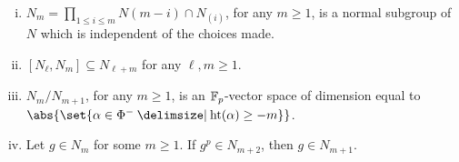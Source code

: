 \begin{lemma}\label{lem:N_m}
  \begin{enumerate}[(i)]
  \item $N_m = \prod_{1 \leq i \leq m} N(m-i) \cap N_{(i)}$, for any $m \geq 1$, is a normal subgroup of $N$ which is independent of the choices made.\label{item:N_m}

  \item $[N_\ell,N_m] \subseteq N_{\ell + m}$ for any $\ell,m \geq 1$.\label{item:N_mcom}

  \item $N_m/N_{m+1}$, for any $m \geq 1$, is an $\mathbb{F}_p$-vector space of dimension equal to $\abs{\set{\alpha \in \Phi^{-} \given \Ht(\alpha) \geq -m}}$.

  \item Let $g \in N_m$ for some $m \geq 1$. If $g^p \in N_{m+2}$, then $g \in N_{m+1}$.\label{item:g^p}
  \end{enumerate}
\end{lemma}
